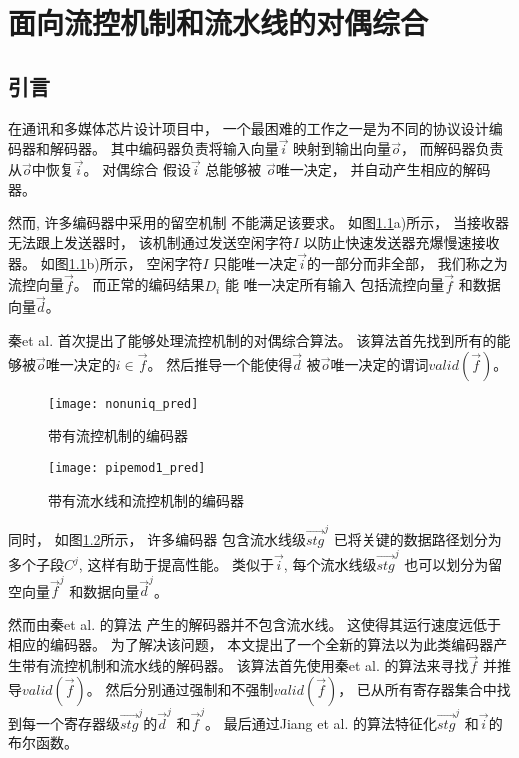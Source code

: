 


\chapter{面向流控机制和流水线的对偶综合}
\label{chap:4}

\section{引言}\label{sec_intro}
在通讯和多媒体芯片设计项目中，
一个最困难的工作之一是为不同的协议设计编码器和解码器。
其中编码器负责将输入向量$\vec{i}$ 映射到输出向量$\vec{o}$，
而解码器负责从$\vec{o}$中恢复$\vec{i}$。
对偶综合\cite{ShenICCAD09,ShenTCAD11,ShenTCAD12,LiuICCAD11,LiuTCAD12,TuDAC13}
假设$\vec{i}$ 总能够被 $\vec{o}$唯一决定，
并自动产生相应的解码器。

然而,
许多编码器中采用的留空机制\cite{flowcontrol}
不能满足该要求。
如图\ref{fig_fc}a)所示，
当接收器无法跟上发送器时，
该机制通过发送空闲字符$I$ 以防止快速发送器充爆慢速接收器。
如图\ref{fig_fc}b)所示，
空闲字符$I$
只能唯一决定$\vec{i}$的一部分而非全部，
我们称之为流控向量$\vec{f}$。
而正常的编码结果$D_i$ 能
唯一决定所有输入
包括流控向量$\vec{f}$ 和数据向量$\vec{d}$。

秦et al. \cite{QinTODAES15} 首次提出了能够处理流控机制的对偶综合算法。
该算法首先找到所有的能够被$\vec{o}$唯一决定的$i\in\vec{f}$。
然后推导一个能使得$\vec{d}$ 被$\vec{o}$唯一决定的谓词$valid(\vec{f})$。

\begin{figure}[t]
\centering
\texttt{[image: nonuniq\_pred]}
\caption{带有流控机制的编码器}
\label{fig_fc}
\end{figure}

\begin{figure}[b]
\centering
\texttt{[image: pipemod1\_pred]}
\caption{带有流水线和流控机制的编码器}
\label{pipemod}
\end{figure}



同时，
如图\ref{pipemod}所示，
许多编码器
包含流水线级$\vec{stg}^j$ 已将关键的数据路径划分为多个子段$C^j$,
这样有助于提高性能。
类似于$\vec{i}$,
每个流水线级$\vec{stg}^j$ 也可以划分为留空向量$\vec{f}^j$ 和数据向量$\vec{d}^j$。

然而由秦et al. 的算法\cite{QinTODAES15} 产生的解码器并不包含流水线。
这使得其运行速度远低于相应的编码器。
为了解决该问题，
本文提出了一个全新的算法以为此类编码器产生带有流控机制和流水线的解码器。
该算法首先使用秦et al. \cite{QinTODAES15}的算法来寻找$\vec{f}$ 并推导$valid(\vec{f})$。
然后分别通过强制和不强制$valid(\vec{f})$，
已从所有寄存器集合中找到每一个寄存器级$\vec{stg}^j$的$\vec{d}^j$ 和$\vec{f}^j$。
最后通过Jiang et al. \cite{InterpBoolFunction}的算法特征化$\vec{stg}^j$ 和$\vec{i}$的布尔函数。

